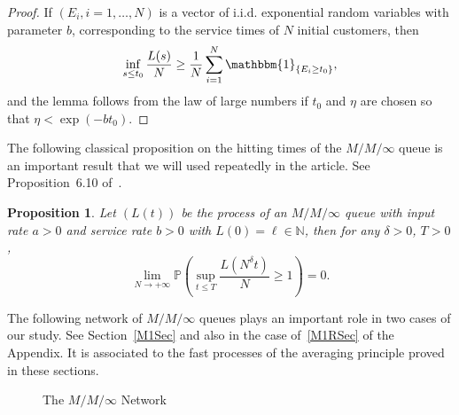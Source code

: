 \documentclass[english]{amsart}
\newcommand{\N}{\ensuremath{\mathbb{N}}}
\renewcommand{\P}{\ensuremath{\mathbb{P}}}
\newcommand{\ind}[1]{\ensuremath{\mathbbm{1}_{\left\{#1\right\}}}}
\newtheorem{proposition}{Proposition}
\numberwithin{proposition}{section}
\begin{document}
\begin{proof}
  If $(E_i,i{=}1,\ldots,N)$ is a vector of i.i.d. exponential random variables with parameter $b$, corresponding to the service times of $N$ initial customers, then
  \[
  \inf_{s\leq t_0}\frac{L(s)}{N}\ge \frac{1}{N}\sum_{i=1}^N\ind{E_i{\ge} t_0},
  \]
  and the lemma follows from the law of large numbers if $t_0$ and $\eta$ are chosen so that $\eta{<}\exp({-}bt_0)$. 
\end{proof}
The following classical proposition on the hitting times of the $M/M/\infty$ queue  is an important result that we will used repeatedly in the article. See Proposition~6.10 of~\citet{Robert}.
\begin{proposition}\label{MMIHit}
Let $(L(t))$ be the process of an $M/M/\infty$ queue with input rate $a{>}0$ and service rate $b{>}0$ with $L(0){=}\ell{\in}\N$, then for any  $\delta{>}0$, $T{>}0$,
    \[
    \lim_{N\to+\infty}\P\left(\sup_{t\leq T}\frac{L(N^\delta t)}{N}\ge 1\right)=0.
    \]
\end{proposition}
The following network of $M/M/\infty$ queues plays an important role in two cases of our study. See Section~\ref{M1Sec} and also in the case of~\ref{M1RSec} of the Appendix. It is associated to the fast processes of the averaging principle proved in these sections. 
\begin{center}
\begin{figure}[h]
\caption{The $M/M/\infty$ Network}\label{FigF1}
\end{figure}
\end{center}
\end{document}
